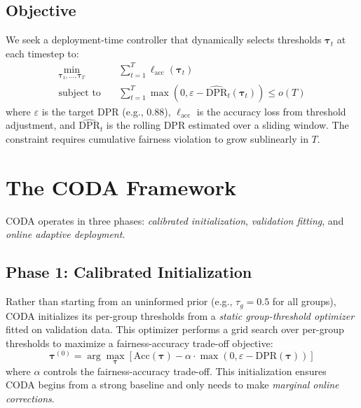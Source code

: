 \documentclass[10pt,twocolumn]{article}
\theoremstyle{definition}
\begin{document}
\subsection{Objective}
We seek a deployment-time controller that dynamically selects thresholds $\boldsymbol{\tau}_t$ at each timestep to:
\begin{equation}
\begin{aligned}
\min_{\boldsymbol{\tau}_1, \ldots, \boldsymbol{\tau}_T} \quad & \sum_{t=1}^T \ell_{\text{acc}}(\boldsymbol{\tau}_t) \\
\text{subject to} \quad & \sum_{t=1}^T \max(0, \varepsilon - \widehat{\text{DPR}}_t(\boldsymbol{\tau}_t)) \leq o(T)
\end{aligned}
\label{eq:objective}
\end{equation}
where $\varepsilon$ is the target DPR (e.g., 0.88), $\ell_{\text{acc}}$ is the accuracy loss from threshold adjustment, and $\widehat{\text{DPR}}_t$ is the rolling DPR estimated over a sliding window. The constraint requires cumulative fairness violation to grow sublinearly in $T$.

\section{The CODA Framework}
\label{sec:method}

CODA operates in three phases: \emph{calibrated initialization}, \emph{validation fitting}, and \emph{online adaptive deployment}.

\subsection{Phase 1: Calibrated Initialization}
\label{sec:calibrated_init}

Rather than starting from an uninformed prior (e.g., $\tau_g = 0.5$ for all groups), CODA initializes its per-group thresholds from a \emph{static group-threshold optimizer} fitted on validation data. This optimizer performs a grid search over per-group thresholds to maximize a fairness-accuracy trade-off objective:
\begin{equation}
\boldsymbol{\tau}^{(0)} = \arg\max_{\boldsymbol{\tau}} \left[ \text{Acc}(\boldsymbol{\tau}) - \alpha \cdot \max(0, \varepsilon - \text{DPR}(\boldsymbol{\tau})) \right]
\label{eq:init}
\end{equation}
where $\alpha$ controls the fairness-accuracy trade-off. This initialization ensures CODA begins from a strong baseline and only needs to make \emph{marginal online corrections}.
\end{document}
